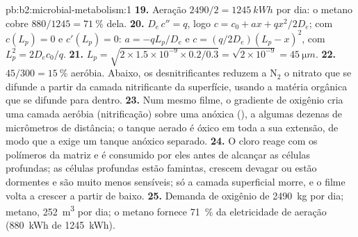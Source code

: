 \begin{solution}{pb:b2:microbial-metabolism:1}
\textbf{19.} Aeração $2490/2 = \qty{1245}{kWh}$ por dia: o metano
cobre $880/1245 = \qty{71}{\%}$ dela.
\textbf{20.} $D_e\,c'' = q$, logo $c = c_0 + ax + qx^2/2D_e$; com
$c(L_p) = 0$ e $c'(L_p) = 0$: $a = -qL_p/D_e$ e $c =
(q/2D_e)(L_p - x)^2$, com $L_p^2 = 2D_ec_0/q$.
\textbf{21.} $L_p = \sqrt{2\times 1.5\times 10^{-9}\times 0.2/0.3} =
\sqrt{2\times 10^{-9}} = \qty{45}{\micro m}$.
\textbf{22.} $45/300 = \qty{15}{\%}$ aeróbia. Abaixo, os
desnitrificantes reduzem a $\mathrm{N_2}$ o nitrato que se difunde a
partir da camada nitrificante da superfície, usando a matéria orgânica
que se difunde para dentro.
\textbf{23.} Num mesmo filme, o gradiente de oxigênio cria uma camada
aeróbia (nitrificação) sobre uma anóxica (), a algumas
dezenas de micrômetros de distância; o tanque aerado é óxico em toda a
sua extensão, de modo que a  exige um tanque anóxico
separado.
\textbf{24.} O cloro reage com os polímeros da matriz e é consumido
por eles antes de alcançar as células profundas; as células profundas
estão famintas, crescem devagar ou estão dormentes e são muito menos
sensíveis; só a camada superficial morre, e o filme volta a crescer a
partir de baixo.
\textbf{25.} Demanda de oxigênio de \qty{2490}{kg} por dia; metano,
\qty{252}{m^3} por dia; o metano fornece \qty{71}{\%} da eletricidade
de aeração (\qty{880}{kWh} de \qty{1245}{kWh}).
\end{solution}
